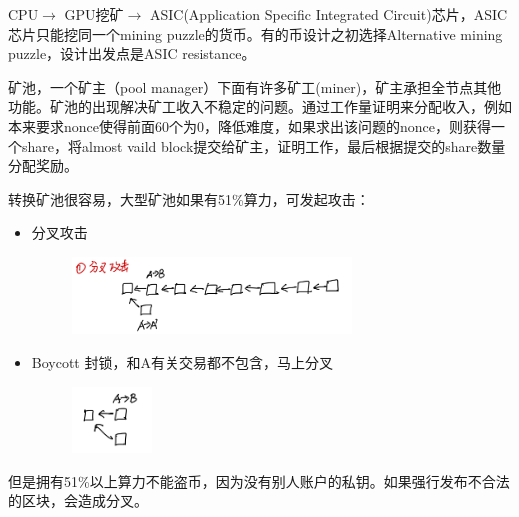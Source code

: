 \documentclass[10pt]{ctexart}
\begin{document}
CPU$\rightarrow$ GPU挖矿$\rightarrow$ ASIC(Application Specific Integrated Circuit)芯片，ASIC芯片只能挖同一个mining puzzle的货币。有的币设计之初选择Alternative mining puzzle，设计出发点是ASIC resistance。

矿池，一个矿主（pool manager）下面有许多矿工(miner)，矿主承担全节点其他功能。矿池的出现解决矿工收入不稳定的问题。通过工作量证明来分配收入，例如本来要求nonce使得前面60个为0，降低难度，如果求出该问题的nonce，则获得一个share，将almost vaild block提交给矿主，证明工作，最后根据提交的share数量分配奖励。

转换矿池很容易，大型矿池如果有51\%算力，可发起攻击：
\begin{itemize}
    \item 分叉攻击
    \begin{figure}[H]
        \centering
        \includegraphics[width=0.7\textwidth]{courses/区块链技术与应用/lecture8/img1.png} 
    \end{figure}
    \item Boycott 封锁，和A有关交易都不包含，马上分叉
    \begin{figure}[H]
        \centering
        \includegraphics[width=0.2\textwidth]{courses/区块链技术与应用/lecture8/img2.png} 
    \end{figure}
\end{itemize}
但是拥有51\%以上算力不能盗币，因为没有别人账户的私钥。如果强行发布不合法的区块，会造成分叉。

  
\end{document}
